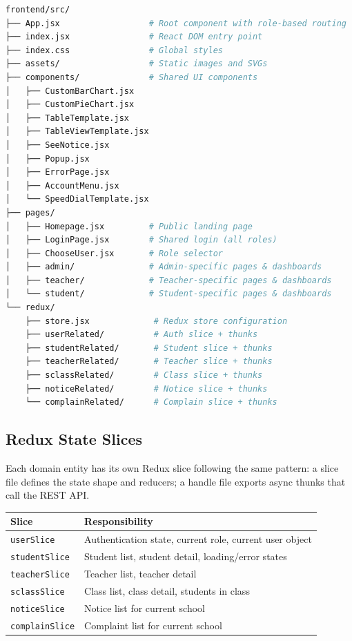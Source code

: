 \documentclass[12pt,a4paper]{report}
\begin{document}
\begin{lstlisting}[language=bash, caption=Frontend source tree]
frontend/src/
├── App.jsx                  # Root component with role-based routing
├── index.jsx                # React DOM entry point
├── index.css                # Global styles
├── assets/                  # Static images and SVGs
├── components/              # Shared UI components
│   ├── CustomBarChart.jsx
│   ├── CustomPieChart.jsx
│   ├── TableTemplate.jsx
│   ├── TableViewTemplate.jsx
│   ├── SeeNotice.jsx
│   ├── Popup.jsx
│   ├── ErrorPage.jsx
│   ├── AccountMenu.jsx
│   └── SpeedDialTemplate.jsx
├── pages/
│   ├── Homepage.jsx         # Public landing page
│   ├── LoginPage.jsx        # Shared login (all roles)
│   ├── ChooseUser.jsx       # Role selector
│   ├── admin/               # Admin-specific pages & dashboards
│   ├── teacher/             # Teacher-specific pages & dashboards
│   └── student/             # Student-specific pages & dashboards
└── redux/
    ├── store.jsx             # Redux store configuration
    ├── userRelated/          # Auth slice + thunks
    ├── studentRelated/       # Student slice + thunks
    ├── teacherRelated/       # Teacher slice + thunks
    ├── sclassRelated/        # Class slice + thunks
    ├── noticeRelated/        # Notice slice + thunks
    └── complainRelated/      # Complain slice + thunks
\end{lstlisting}

\subsection{Redux State Slices}

Each domain entity has its own Redux slice following the same pattern: a slice file defines the state shape and reducers; a handle file exports async thunks that call the REST API.

\begin{longtable}{@{}p{4.5cm}p{9.5cm}@{}}
  \toprule
  \textbf{Slice} & \textbf{Responsibility} \\
  \midrule
  \endhead
  \texttt{userSlice} & Authentication state, current role, current user object \\[4pt]
  \texttt{studentSlice} & Student list, student detail, loading/error states \\[4pt]
  \texttt{teacherSlice} & Teacher list, teacher detail \\[4pt]
  \texttt{sclassSlice} & Class list, class detail, students in class \\[4pt]
  \texttt{noticeSlice} & Notice list for current school \\[4pt]
  \texttt{complainSlice} & Complaint list for current school \\
  \bottomrule
\end{longtable}
\end{document}
